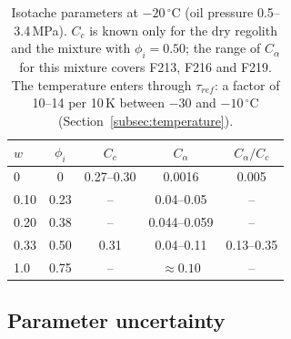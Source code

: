 \begin{table}[H]
\centering
\small
\begin{tabular}{@{}lcccc@{}}
\toprule
$w$ & $\phi_i$ & $C_c$ & $C_\alpha$ & $C_\alpha/C_c$ \\
\midrule
0 & 0 & 0.27--0.30 & 0.0016 & 0.005 \\
0.10 & 0.23 & -- & 0.04--0.05 & -- \\
0.20 & 0.38 & -- & 0.044--0.059 & -- \\
0.33 & 0.50 & 0.31 & 0.04--0.11 & 0.13--0.35 \\
1.0 & 0.75 & -- & $\approx0.10$ & -- \\
\bottomrule
\end{tabular}
\caption{Isotache parameters at $-20\,^\circ$C (oil pressure 0.5--3.4\,MPa). $C_c$ is known only for the dry regolith and the mixture with $\phi_i = 0.50$; the range of $C_\alpha$ for this mixture covers F213, F216 and F219. The temperature enters through $\tau_{ref}$: a factor of 10--14 per 10\,K between $-30$ and $-10\,^\circ$C (Section~\ref{subsec:temperature}).}
\label{tab:isotache_params}
\end{table}

\subsection{Parameter uncertainty}
\label{subsec:uncertainty}

